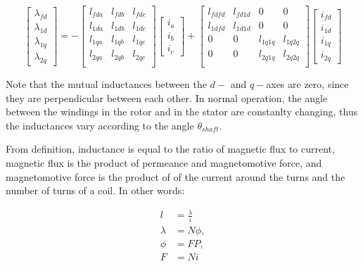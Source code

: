 \begin{equation}
    \begin{bmatrix}
        \lambda_{fd} \\ \lambda_{1d} \\ \lambda_{1q} \\ \lambda_{2q}
    \end{bmatrix}
    =
    - \begin{bmatrix}
        l_{fda} & l_{fdb} & l_{fdc} \\
        l_{1da} & l_{1db} & l_{1dc} \\
        l_{1qa} & l_{1qb} & l_{1qc} \\
        l_{2qa} & l_{2qb} & l_{2qc} \\
    \end{bmatrix}
    \begin{bmatrix}
        i_a \\ i_b \\ i_c
    \end{bmatrix}
    + \begin{bmatrix}
        l_{fdfd} & l_{fd1d} & 0 & 0\\
        l_{1dfd} & l_{1d1d} & 0 & 0\\
        0 & 0 & l_{1q1q} & l_{1q2q}\\
        0 & 0 & l_{2q1q} & l_{2q2q}\\
    \end{bmatrix}
    \begin{bmatrix}
        i_{fd} \\ i_{1d} \\ i_{1q} \\ i_{2q}
    \end{bmatrix}
    \label{eq:lin_circuit_rotor}
\end{equation}

Note that the mutual inductances between the $d-$ and $q-$axes are zero, since
they are perpendicular between each other. In normal operation, the angle
between the windings in the rotor and in the stator are constanlty changing,
thus the inductances vary according to the angle $\theta_{shaft}$.

From definition, inductance is equal to the ratio of magnetic flux to current,
magnetic flux is the product of permeance and magnetomotive force, and
magnetomotive force is the product of of the current around the turns and the
number of turns of a coil\cite{purcell2013magnetism}. In other words:

\begin{equation*}
    \begin{aligned}
        l &= \frac{\lambda}{i}\\
        \lambda &= N\phi,\\
        \phi&=FP, \\
        F&=Ni
    \end{aligned}
\end{equation*}


